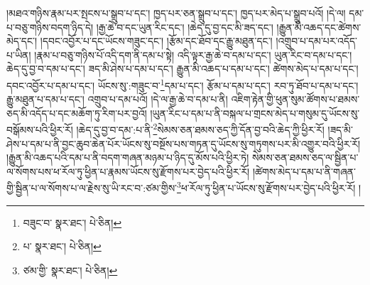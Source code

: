 །མཐའ་གཉིས་རྣམ་པར་སྤངས་པ་སྒྲུབ་པ་དང་། ཁྱད་པར་ཅན་སྒྲུབ་པ་དང་། ཁྱད་པར་མེད་པ་སྒྲུབ་པའོ། །དེ་ལ། དམ་པ་བཅུ་གཉིས་བདག་ཉིད་དེ། །རྒྱ་ཆེ་བ་དང་ཡུན་རིང་དང་། །ཆེད་དུ་བྱ་དང་མི་ཟད་དང་། །རྒྱུན་མི་འཆད་དང་ཚེགས་མེད་དང་། །དབང་འབྱོར་པ་དང་ཡོངས་གཟུང་དང་། །རྩོམ་དང་ཐོབ་དང་རྒྱུ་མཐུན་དང་། །འགྲུབ་པ་དམ་པར་འདོད་པ་ཡིན། །རྣམ་པ་བཅུ་གཉིས་པོ་འདི་དག་ནི་དམ་པ་སྟེ། འདི་ལྟར་རྒྱ་ཆེ་བ་དམ་པ་དང་། ཡུན་རིང་བ་དམ་པ་དང་། ཆེད་དུ་བྱ་བ་དམ་པ་དང་། ཟད་མི་ཤེས་པ་དམ་པ་དང་། རྒྱུན་མི་འཆད་པ་དམ་པ་དང་། ཚེགས་མེད་པ་དམ་པ་དང་། དབང་འབྱོར་པ་དམ་པ་དང་། ཡོངས་སུ་:གཟུང་བ་\footnote{བཟུང་བ་  སྣར་ཐང་།  པེ་ཅིན། }དམ་པ་དང་། རྩོམ་པ་དམ་པ་དང་། རབ་ཏུ་ཐོབ་པ་དམ་པ་དང་། རྒྱུ་མཐུན་པ་དམ་པ་དང་། འགྲུབ་པ་དམ་པའོ། །དེ་ལ་རྒྱ་ཆེ་བ་དམ་པ་ནི། འཇིག་རྟེན་གྱི་ཕུན་སུམ་ཚོགས་པ་ཐམས་ཅད་མི་འདོད་པ་དང་མཆོག་ཏུ་རིག་པར་བྱའོ། །ཡུན་རིང་པ་དམ་པ་ནི་བསྐལ་པ་གྲངས་མེད་པ་གསུམ་དུ་ཡོངས་སུ་བསྒོམས་པའི་ཕྱིར་རོ། །ཆེད་དུ་བྱ་བ་དམ་:པ་ནི་\footnote{པ་  སྣར་ཐང་།  པེ་ཅིན། }སེམས་ཅན་ཐམས་ཅད་ཀྱི་དོན་བྱ་བའི་ཆེད་ཀྱི་ཕྱིར་རོ། །ཟད་མི་ཤེས་པ་དམ་པ་ནི་བྱང་ཆུབ་ཆེན་པོར་ཡོངས་སུ་བསྔོས་པས་གཏན་དུ་ཡོངས་སུ་གཏུགས་པར་མི་འགྱུར་བའི་ཕྱིར་རོ། །རྒྱུན་མི་འཆད་པའི་དམ་པ་ནི་བདག་གཞན་མཉམ་པ་ཉིད་དུ་མོས་པའི་ཕྱིར་ཏེ། སེམས་ཅན་ཐམས་ཅད་ལ་སྦྱིན་པ་ལ་སོགས་པས་ཕ་རོལ་ཏུ་ཕྱིན་པ་རྣམས་ཡོངས་སུ་རྫོགས་པར་བྱེད་པའི་ཕྱིར་རོ། །ཚེགས་མེད་པ་དམ་པ་ནི་གཞན་གྱི་སྦྱིན་པ་ལ་སོགས་པ་ལ་རྗེས་སུ་ཡི་རང་བ་:ཙམ་གྱིས་\footnote{ཙམ་གྱི་  སྣར་ཐང་།  པེ་ཅིན། }ཕ་རོལ་ཏུ་ཕྱིན་པ་ཡོངས་སུ་རྫོགས་པར་བྱེད་པའི་ཕྱིར་རོ། །
